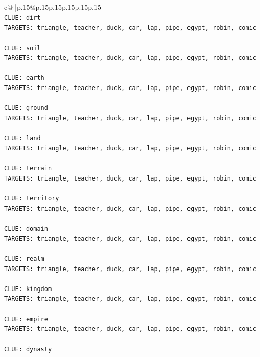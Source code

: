 \documentclass{article}
\begin{document}
{\begin{supertabular}{c@{$\;$}|p{.15\linewidth}@{}p{.15\linewidth}p{.15\linewidth}p{.15\linewidth}p{.15\linewidth}p{.15\linewidth}}
{{{\\ 
\texttt{CLUE: dirt} \\
\texttt{TARGETS: triangle, teacher, duck, car, lap, pipe, egypt, robin, comic} \\
\\ 
\texttt{CLUE: soil} \\
\texttt{TARGETS: triangle, teacher, duck, car, lap, pipe, egypt, robin, comic} \\
\\ 
\texttt{CLUE: earth} \\
\texttt{TARGETS: triangle, teacher, duck, car, lap, pipe, egypt, robin, comic} \\
\\ 
\texttt{CLUE: ground} \\
\texttt{TARGETS: triangle, teacher, duck, car, lap, pipe, egypt, robin, comic} \\
\\ 
\texttt{CLUE: land} \\
\texttt{TARGETS: triangle, teacher, duck, car, lap, pipe, egypt, robin, comic} \\
\\ 
\texttt{CLUE: terrain} \\
\texttt{TARGETS: triangle, teacher, duck, car, lap, pipe, egypt, robin, comic} \\
\\ 
\texttt{CLUE: territory} \\
\texttt{TARGETS: triangle, teacher, duck, car, lap, pipe, egypt, robin, comic} \\
\\ 
\texttt{CLUE: domain} \\
\texttt{TARGETS: triangle, teacher, duck, car, lap, pipe, egypt, robin, comic} \\
\\ 
\texttt{CLUE: realm} \\
\texttt{TARGETS: triangle, teacher, duck, car, lap, pipe, egypt, robin, comic} \\
\\ 
\texttt{CLUE: kingdom} \\
\texttt{TARGETS: triangle, teacher, duck, car, lap, pipe, egypt, robin, comic} \\
\\ 
\texttt{CLUE: empire} \\
\texttt{TARGETS: triangle, teacher, duck, car, lap, pipe, egypt, robin, comic} \\
\\ 
\texttt{CLUE: dynasty} \\
}}}
\end{supertabular}}
\end{document}
